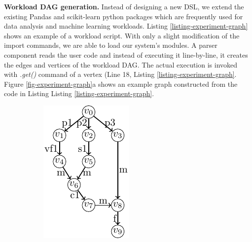 \textbf{Workload DAG generation.}
Instead of designing a new DSL, we extend the existing Pandas and scikit-learn \cite{sklearn_api} python packages which are frequently used for data analysis and machine learning workloads.
Listing \ref{listing-experiment-graph} shows an example of a workload script.
With only a slight modification of the import commands, we are able to load our system's modules.
A parser component reads the user code and instead of executing it line-by-line, it creates the edges and vertices of the workload DAG.
The actual execution is invoked with \textit{.get()} command of a vertex (Line 18, Listing \ref{listing-experiment-graph}.
Figure \ref{fig-experiment-graph}a shows an example graph constructed from the code in Listing  Listing \ref{listing-experiment-graph}.
\begin{figure}
\begin{subfigure}[b]{0.4\linewidth}
\centering
\includegraphics[width=0.8\linewidth]{../images/tikz-standalone/example-graph}
\caption{}
\end{subfigure}%
\begin{subfigure}[b]{0.6\linewidth}

\end{subfigure}
\end{figure}
